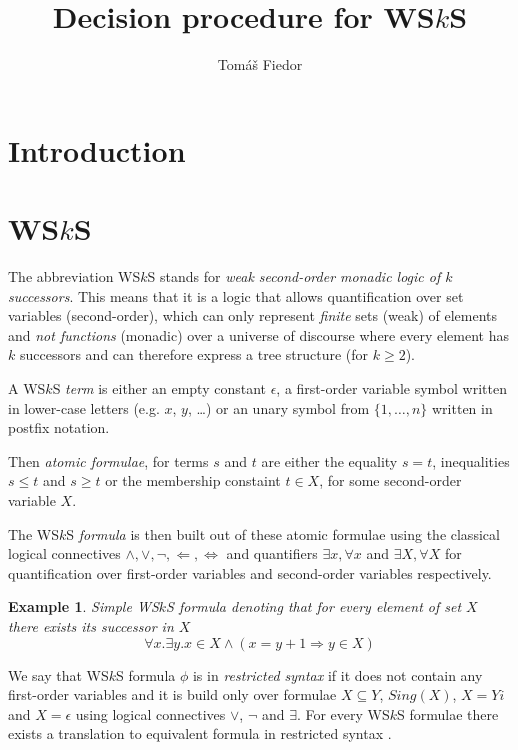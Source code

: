 \documentclass{eeict}
\title{Decision procedure for WS$k$S}
\author{Tomáš Fiedor}
\newtheorem{example}{Example}[section]
\begin{document}
\maketitle

\section{Introduction}

\section{WS$k$S}

The abbreviation WS$k$S \cite{wsks} stands for \emph{weak second-order monadic
logic of $k$ successors}. This means that it is a logic that allows quantification over set
variables (second-order), which can only represent \emph{finite} sets (weak) of
elements and \emph{not functions} (monadic) over a universe of discourse where
every element has $k$ successors and can therefore express a tree structure
(for $k \geq 2$).

A WS$k$S \emph{term} is either an empty constant $\epsilon$, a first-order
variable symbol written in lower-case letters (e.g. $x$, $y$, \ldots) or an
unary symbol from $\{1,\ldots,n\}$ written in postfix notation. 

Then \emph{atomic formulae}, for terms $s$ and $t$ are either the equality $s =
t$, inequalities $s \leq t$ and $s \geq t$ or the membership constaint $t \in
X$, for some second-order variable $X$.

The WS$k$S \emph{formula} is then built out of these atomic formulae using the
classical logical connectives $\wedge, \vee, \neg, \Leftarrow, \Leftrightarrow$
and quantifiers $\exists x, \forall x$ and $\exists X, \forall X$ for
quantification over first-order variables and second-order variables
respectively.

\begin{example} Simple WS$k$S formula denoting that for every element of set $X$
there exists its successor in $X$ $$ \forall x. \exists y. x \in X \wedge (x = y
+ 1 \Rightarrow y \in X) $$
\end{example}

We say that WS$k$S formula $\phi$ is in \emph{restricted syntax} if it does not
contain any first-order variables and it is build only over formulae $X
\subseteq Y$, $Sing(X)$, $X = Yi$ and $X = \epsilon$ using logical connectives
$\vee$, $\neg$ and $\exists$. For every WS$k$S formulae there exists a
translation to equivalent formula in restricted syntax \cite{tata}.
\end{document}
